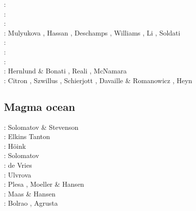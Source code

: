 \begin{scriptsize}
\twothousandtwelve: \cite{stto12}\cite{dagd12}\cite{dect12}\\
\twothousandthirteen: \cite{limc13}\cite{bogs13a}\cite{bogs13b}\\
\twothousandfourteen: \cite{budt14}\cite{lidt14}\cite{tovd14}\\
\twothousandfifteen: Mulyukova \etal \cite{musd15}, Hassan \etal \cite{hafg15}, Deschamps \etal \cite{delt15},
                     Williams \etal \cite{wilm15}, Li \etal \cite{lidt15}, Soldati \etal \cite{sobd15}\\
\twothousandsixteen: \cite{dost16}\cite{tosa16}\\
\twothousandseventeen: \cite{hish17}\cite{lizh17}\\
\twothousandeighteen: \cite{daga18}\cite{lizo18}\cite{hect18}\cite{dert18}\\
\twothousandnineteen: Hernlund \& Bonati \cite{hebo19}, Reali \etal \cite{rejv19}, McNamara \cite{mcna19}\\
\twothousandtwenty: Citron \etal \cite{cilw20}, Szwillus \etal \cite{szes20}, Schierjott \etal \cite{scrt20},
                    Davaille \& Romanowicz \cite{daro20}, Heyn \etal \cite{hect20b}
\end{scriptsize}

\subsection{Magma ocean}

\begin{scriptsize}
\nineteenninetythree: Solomatov \& Stevenson \cite{sost93a,sost93b}\\
\twothousandtwo: Elkins Tanton \etal \cite{elvh02}\\
\twothousandsix: H\"oink \etal\cite{hosh06}\\
\twothousandseven: Solomatov \cite{solo07} \\
\twothousandten: de Vries \etal \cite{devv10}\\
\twothousandtwelve: Ulvrova \etal \cite{ullc12}\\
\twothousandthirteen: Plesa \etal \cite{plth13}, Moeller \& Hansen \cite{moha13}\\
\twothousandfifteen: Maas \& Hansen \cite{maha15}\\
\twothousandtwenty: Bolrao \etal \cite{bobm20}, Agrusta \etal \cite{agml20}
\end{scriptsize}

